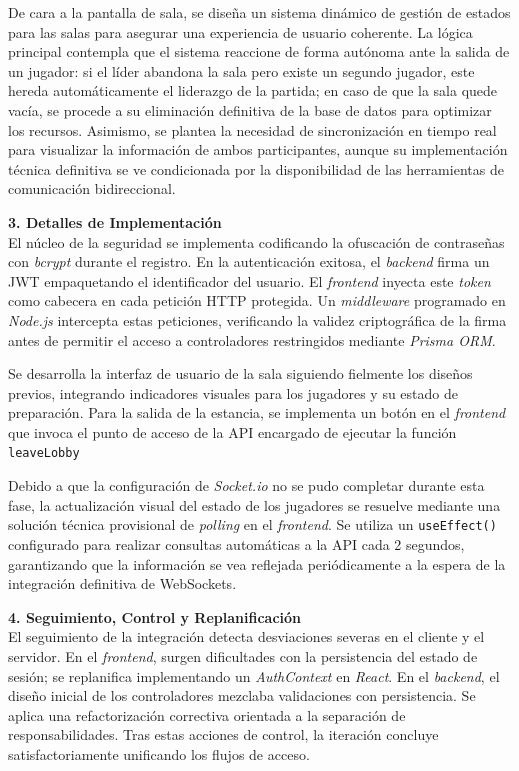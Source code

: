 De cara a la pantalla de sala, se diseña un sistema dinámico de gestión de estados para las salas para asegurar una experiencia de usuario coherente. La lógica principal contempla que el sistema reaccione de forma autónoma ante la salida de un jugador: si el líder abandona la sala pero existe un segundo jugador, este hereda automáticamente el liderazgo de la partida; en caso de que la sala quede vacía, se procede a su eliminación definitiva de la base de datos para optimizar los recursos. Asimismo, se plantea la necesidad de sincronización en tiempo real para visualizar la información de ambos participantes, aunque su implementación técnica definitiva se ve condicionada por la disponibilidad de las herramientas de comunicación bidireccional.

\textbf{3. Detalles de Implementación} \\
El núcleo de la seguridad se implementa codificando la ofuscación de contraseñas con \textit{bcrypt} durante el registro. En la autenticación exitosa, el \textit{backend} firma un JWT empaquetando el identificador del usuario. El \textit{frontend} inyecta este \textit{token} como cabecera en cada petición HTTP protegida. Un \textit{middleware} programado en \textit{Node.js} intercepta estas peticiones, verificando la validez criptográfica de la firma antes de permitir el acceso a controladores restringidos mediante \textit{Prisma ORM}.

Se desarrolla la interfaz de usuario de la sala siguiendo fielmente los diseños previos, integrando indicadores visuales para los jugadores y su estado de preparación. Para la salida de la estancia, se implementa un botón en el \textit{frontend} que invoca el punto de acceso de la API encargado de ejecutar la función \texttt{leaveLobby}

Debido a que la configuración de \textit{Socket.io} no se pudo completar durante esta fase, la actualización visual del estado de los jugadores se resuelve mediante una solución técnica provisional de \textit{polling} en el \textit{frontend}. Se utiliza un \texttt{useEffect()} configurado para realizar consultas automáticas a la API cada 2 segundos, garantizando que la información se vea reflejada periódicamente a la espera de la integración definitiva de WebSockets.

\textbf{4. Seguimiento, Control y Replanificación} \\
El seguimiento de la integración detecta desviaciones severas en el cliente y el servidor. En el \textit{frontend}, surgen dificultades con la persistencia del estado de sesión; se replanifica implementando un \textit{AuthContext} en \textit{React}. En el \textit{backend}, el diseño inicial de los controladores mezclaba validaciones con persistencia. Se aplica una refactorización correctiva orientada a la separación de responsabilidades. Tras estas acciones de control, la iteración concluye satisfactoriamente unificando los flujos de acceso.

